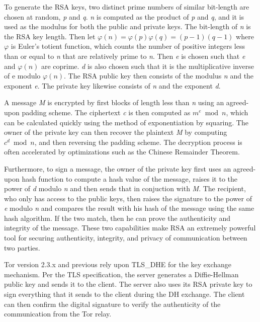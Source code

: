 \documentclass[journal]{IEEEtran}
\begin{document}
To generate the RSA keys, two distinct prime numbers of similar bit-length are chosen at random, \textit{p} and \textit{q}. \textit{n} is computed as the product of \textit{p} and \textit{q}, and it is used as the modulus for both the public and private keys. The bit-length of \textit{n} is the RSA key length. Then let $ \varphi(n) = \varphi(p)\varphi(q) = (p - 1)(q - 1) $ where $ \varphi $ is Euler's totient function, which counts the number of positive integers less than or equal to \textit{n} that are relatively prime to \textit{n}. Then \textit{e} is chosen such that \textit{e} and $ \varphi(n) $ are coprime. \textit{d} is also chosen such that it is the multiplicative inverse of e modulo $ \varphi(n) $. The RSA public key then consists of the modulus \textit{n} and the exponent \textit{e}. The private key likewise consists of \textit{n} and the exponent \textit{d}.

A message \textit{M} is encrypted by first blocks of length less than \textit{n} using an agreed-upon padding scheme. The ciphertext \textit{c} is then computed as $ m^e \bmod n $, which can be calculated quickly using the method of exponentiation by squaring. The owner of the private key can then recover the plaintext \textit{M} by computing $ c^d \bmod n $, and then reversing the padding scheme. The decryption process is often accelerated by optimizations such as the Chinese Remainder Theorem.

Furthermore, to sign a message, the owner of the private key first uses an agreed-upon hash function to compute a hash value of the message, raises it to the power of \textit{d} modulo \textit{n} and then sends that in conjuction with \textit{M}. The recipient, who only has access to the public keys, then raises the signature to the power of \textit{e} modulo \textit{n} and compares the result with his hash of the message using the same hash algorithm. If the two match, then he can prove the authenticity and integrity of the message. These two capabilities make RSA an extremely powerful tool for securing authenticity, integrity, and privacy of communication between two parties.

Tor version 2.3.x and previous rely upon TLS\_DHE for the key exchange mechanism. Per the TLS specification, the server generates a Diffie-Hellman public key and sends it to the client. The server also uses its RSA private key to sign everything that it sends to the client during the DH exchange. The client can then confirm the digital signature to verify the authenticity of the communication from the Tor relay.
\end{document}
